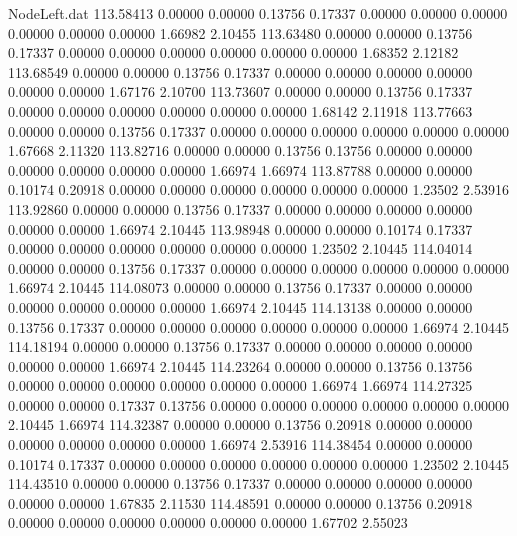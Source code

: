 \begin{filecontents}{NodeLeft.dat}
 113.58413    0.00000    0.00000     0.13756    0.17337    0.00000    0.00000    0.00000    0.00000    0.00000    0.00000    1.66982    2.10455
 113.63480    0.00000    0.00000     0.13756    0.17337    0.00000    0.00000    0.00000    0.00000    0.00000    0.00000    1.68352    2.12182
 113.68549    0.00000    0.00000     0.13756    0.17337    0.00000    0.00000    0.00000    0.00000    0.00000    0.00000    1.67176    2.10700
 113.73607    0.00000    0.00000     0.13756    0.17337    0.00000    0.00000    0.00000    0.00000    0.00000    0.00000    1.68142    2.11918
 113.77663    0.00000    0.00000     0.13756    0.17337    0.00000    0.00000    0.00000    0.00000    0.00000    0.00000    1.67668    2.11320
 113.82716    0.00000    0.00000     0.13756    0.13756    0.00000    0.00000    0.00000    0.00000    0.00000    0.00000    1.66974    1.66974
 113.87788    0.00000    0.00000     0.10174    0.20918    0.00000    0.00000    0.00000    0.00000    0.00000    0.00000    1.23502    2.53916
 113.92860    0.00000    0.00000     0.13756    0.17337    0.00000    0.00000    0.00000    0.00000    0.00000    0.00000    1.66974    2.10445
 113.98948    0.00000    0.00000     0.10174    0.17337    0.00000    0.00000    0.00000    0.00000    0.00000    0.00000    1.23502    2.10445
 114.04014    0.00000    0.00000     0.13756    0.17337    0.00000    0.00000    0.00000    0.00000    0.00000    0.00000    1.66974    2.10445
 114.08073    0.00000    0.00000     0.13756    0.17337    0.00000    0.00000    0.00000    0.00000    0.00000    0.00000    1.66974    2.10445
 114.13138    0.00000    0.00000     0.13756    0.17337    0.00000    0.00000    0.00000    0.00000    0.00000    0.00000    1.66974    2.10445
 114.18194    0.00000    0.00000     0.13756    0.17337    0.00000    0.00000    0.00000    0.00000    0.00000    0.00000    1.66974    2.10445
 114.23264    0.00000    0.00000     0.13756    0.13756    0.00000    0.00000    0.00000    0.00000    0.00000    0.00000    1.66974    1.66974
 114.27325    0.00000    0.00000     0.17337    0.13756    0.00000    0.00000    0.00000    0.00000    0.00000    0.00000    2.10445    1.66974
 114.32387    0.00000    0.00000     0.13756    0.20918    0.00000    0.00000    0.00000    0.00000    0.00000    0.00000    1.66974    2.53916
 114.38454    0.00000    0.00000     0.10174    0.17337    0.00000    0.00000    0.00000    0.00000    0.00000    0.00000    1.23502    2.10445
 114.43510    0.00000    0.00000     0.13756    0.17337    0.00000    0.00000    0.00000    0.00000    0.00000    0.00000    1.67835    2.11530
 114.48591    0.00000    0.00000     0.13756    0.20918    0.00000    0.00000    0.00000    0.00000    0.00000    0.00000    1.67702    2.55023

\end{filecontents}
